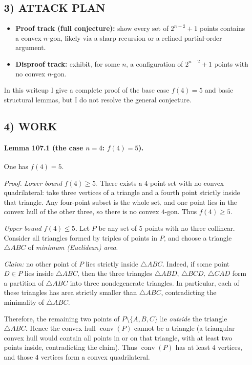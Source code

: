 \subsection*{3) ATTACK PLAN}
\begin{itemize}
\item \textbf{Proof track (full conjecture):} show every set of $2^{n-2}+1$ points contains a convex $n$-gon, likely via a sharp recursion or a refined partial-order argument.
\item \textbf{Disproof track:} exhibit, for some $n$, a configuration of $2^{n-2}+1$ points with no convex $n$-gon.
\end{itemize}
In this writeup I give a complete proof of the base case $f(4)=5$ and basic structural lemmas, but I do not resolve the general conjecture.

\subsection*{4) WORK}
\paragraph{Lemma 107.1 (the case $n=4$: $f(4)=5$).}
One has $f(4)=5$.

\emph{Proof.}
\emph{Lower bound $f(4)\ge5$.}  There exists a $4$-point set with no convex quadrilateral: take three vertices of a triangle and a fourth point strictly inside that triangle.  Any four-point subset is the whole set, and one point lies in the convex hull of the other three, so there is no convex $4$-gon.  Thus $f(4)\ge5$.

\emph{Upper bound $f(4)\le5$.}  Let $P$ be any set of $5$ points with no three collinear.  Consider all triangles formed by triples of points in $P$, and choose a triangle $\triangle ABC$ of \emph{minimum (Euclidean) area}.

\emph{Claim:} no other point of $P$ lies strictly inside $\triangle ABC$.
Indeed, if some point $D\in P$ lies inside $\triangle ABC$, then the three triangles $\triangle ABD$, $\triangle BCD$, $\triangle CAD$ form a partition of $\triangle ABC$ into three nondegenerate triangles.  In particular, each of these triangles has area strictly smaller than $\triangle ABC$, contradicting the minimality of $\triangle ABC$.

Therefore, the remaining two points of $P\setminus\{A,B,C\}$ lie \emph{outside} the triangle $\triangle ABC$.  Hence the convex hull $\operatorname{conv}(P)$ cannot be a triangle (a triangular convex hull would contain all points in or on that triangle, with at least two points inside, contradicting the claim).  Thus $\operatorname{conv}(P)$ has at least $4$ vertices, and those $4$ vertices form a convex quadrilateral.

